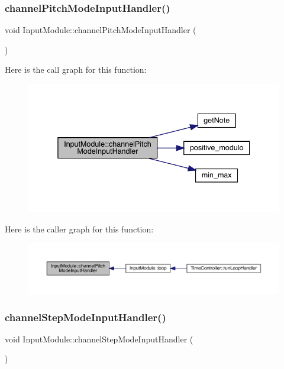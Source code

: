 \subsubsection{\texorpdfstring{channel\+Pitch\+Mode\+Input\+Handler()}{channelPitchModeInputHandler()}}
{\footnotesize\ttfamily void Input\+Module\+::channel\+Pitch\+Mode\+Input\+Handler (\begin{DoxyParamCaption}{ }\end{DoxyParamCaption})}

Here is the call graph for this function\+:
\nopagebreak
\begin{figure}[H]
\begin{center}
\leavevmode
\includegraphics[width=338pt]{class_input_module_af8193a3e5f84adb8a139d624742b8c6a_cgraph}
\end{center}
\end{figure}
Here is the caller graph for this function\+:
\nopagebreak
\begin{figure}[H]
\begin{center}
\leavevmode
\includegraphics[width=350pt]{class_input_module_af8193a3e5f84adb8a139d624742b8c6a_icgraph}
\end{center}
\end{figure}
\mbox{\label{class_input_module_ae5323fd937a03aff47a5696c67ca87d2}} 
\subsubsection{\texorpdfstring{channel\+Step\+Mode\+Input\+Handler()}{channelStepModeInputHandler()}}
{\footnotesize\ttfamily void Input\+Module\+::channel\+Step\+Mode\+Input\+Handler (\begin{DoxyParamCaption}{ }\end{DoxyParamCaption})}

